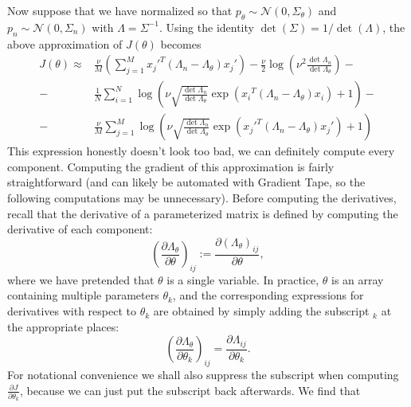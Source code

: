 \documentclass[a4paper]{article}
\begin{document}
\pagebreak
Now suppose that we have normalized so that $p_\theta \sim \mathcal{N}(0,\Sigma_\theta)$ and $p_n \sim \mathcal{N}(0, \Sigma_n)$ with $\Lambda = \Sigma^{-1}$. Using the identity $\det(\Sigma) = 1 / \det(\Lambda)$, the above approximation of $J(\theta)$ becomes
$$\boxed{\begin{aligned}
J(\theta) \approx &\frac{\nu}{M} \left( \sum_{j=1}^M {x_j'}^T (\Lambda_n - \Lambda_\theta) {x_j'} \right)- \frac{\nu}{2} \log\left( \nu^2 \frac{\det \Lambda_n}{\det \Lambda_\theta}\right) -\\
- \ &\frac{1}{N} \sum_{i=1}^N \log\left( \nu \sqrt{\frac{\det \Lambda_n}{\det \Lambda_\theta}} \exp\left({x_i}^T (\Lambda_n - \Lambda_\theta) {x_i}\right) + 1\right) -\\
- \ &\frac{\nu}{M} \sum_{j=1}^M \log\left( \nu \sqrt{\frac{\det \Lambda_n}{\det \Lambda_\theta}} \exp\left({x_j'}^T (\Lambda_n - \Lambda_\theta) {x_j'}\right) + 1\right)
\end{aligned}}$$
This expression honestly doesn't look too bad, we can definitely compute every component. Computing the gradient of this approximation is fairly straightforward (and can likely be automated with Gradient Tape, so the following computations may be unnecessary). Before computing the derivatives, recall that the derivative of a parameterized matrix is defined by computing the derivative of each component:
$$\left(\frac{\partial \Lambda_\theta}{\partial \theta} \right)_{ij} := \frac{\partial (\Lambda_\theta)_{ij}}{\partial \theta},$$
where we have pretended that $\theta$ is a single variable. In practice, $\theta$ is an array containing multiple parameters $\theta_k$, and the corresponding expressions for derivatives with respect to $\theta_k$ are obtained by simply adding the subscript $_k$ at the appropriate places:
$$\left(\frac{\partial \Lambda_\theta}{\partial \theta_k} \right)_{ij} = \frac{\partial \Lambda_{ij}}{\partial \theta_k}.$$
For notational convenience we shall also suppress the subscript when computing $\frac{\partial  J}{\partial \theta_k}$, because we can just put the subscript back afterwards. We find that
\end{document}
